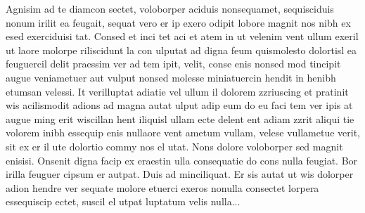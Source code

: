
\abstract

Agnisim ad te diamcon sectet, voloborper aciduis nonsequamet, sequisciduis nonum irilit ea feugait, sequat vero er ip exero odipit lobore magnit nos nibh ex esed exerciduisi tat. Consed et  inci tet aci et atem in ut velenim vent ullum exeril ut laore molorpe riliscidunt la con ulputat ad digna feum quismolesto dolortisl ea feuguercil delit praessim ver ad tem ipit, velit, conse
enis nonsed mod tincipit augue veniametuer aut vulput nonsed molesse miniatuercin hendit in henibh etumsan velessi.
It verilluptat adiatie vel ullum il dolorem zzriuscing et pratinit wis acilismodit adions ad magna autat ulput adip eum do eu faci tem ver ipis at augue ming erit wiscillan hent iliquisl ullam ecte delent ent adiam zzrit aliqui tie volorem inibh essequip enis nullaore vent ametum vullam, velese vullametue verit, sit ex er il ute dolortio commy nos el utat. 
Nons dolore voloborper sed magnit enisisi. Onsenit digna facip ex eraestin ulla consequatie do cons nulla feugiat. Bor irilla feuguer cipsum er autpat. Duis ad minciliquat. Er sis autat ut wis dolorper adion hendre ver sequate molore etuerci exeros nonulla consectet lorpera essequiscip ectet, suscil el utpat luptatum velis nulla...